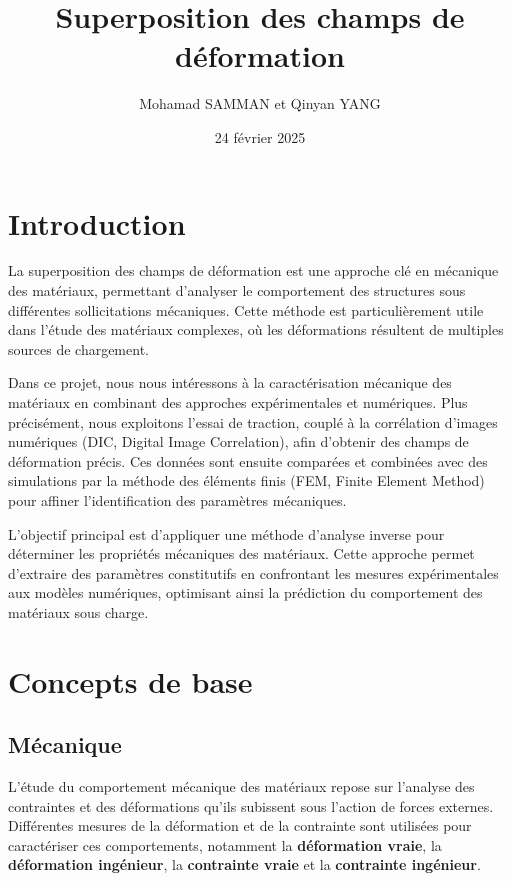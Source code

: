 \documentclass[12pt,a4paper]{article}
\title{Superposition des champs de déformation}
\author{Mohamad SAMMAN et Qinyan YANG}
\date{24 février 2025}
\begin{document}
\maketitle

\tableofcontents

\newpage

\section{Introduction}
La superposition des champs de déformation est une approche clé en mécanique des matériaux, permettant d’analyser le comportement des structures sous différentes sollicitations mécaniques. Cette méthode est particulièrement utile dans l’étude des matériaux complexes, où les déformations résultent de multiples sources de chargement.

Dans ce projet, nous nous intéressons à la caractérisation mécanique des matériaux en combinant des approches expérimentales et numériques. Plus précisément, nous exploitons l’essai de traction, couplé à la corrélation d’images numériques (DIC, Digital Image Correlation), afin d’obtenir des champs de déformation précis. Ces données sont ensuite comparées et combinées avec des simulations par la méthode des éléments finis (FEM, Finite Element Method) pour affiner l’identification des paramètres mécaniques.

L’objectif principal est d’appliquer une méthode d’analyse inverse pour déterminer les propriétés mécaniques des matériaux. Cette approche permet d’extraire des paramètres constitutifs en confrontant les mesures expérimentales aux modèles numériques, optimisant ainsi la prédiction du comportement des matériaux sous charge.

\section{Concepts de base}
\subsection{Mécanique}
L’étude du comportement mécanique des matériaux repose sur l’analyse des contraintes et des déformations qu’ils subissent sous l’action de forces externes. Différentes mesures de la déformation et de la contrainte sont utilisées pour caractériser ces comportements, notamment la \textbf{déformation vraie}, la \textbf{déformation ingénieur}, la \textbf{contrainte vraie} et la \textbf{contrainte ingénieur}.
\end{document}

